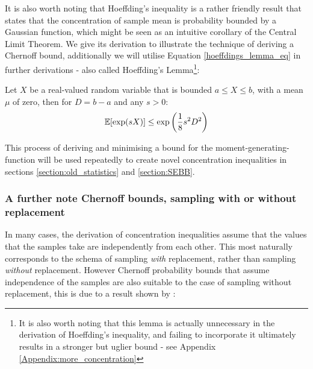 
It is also worth noting that Hoeffding's inequality is a rather friendly result that states that the concentration of sample mean is probability bounded by a Gaussian function, which might be seen as an intuitive corollary of the Central Limit Theorem. 
We give its derivation to illustrate the technique of deriving a Chernoff bound, additionally we will utilise Equation \ref{hoeffdings_lemma_eq} in further derivations - also called Hoeffding's Lemma\footnote{It is also worth noting that this lemma is actually unnecessary in the derivation of Hoeffding's inequality, and failing to incorporate it ultimately results in a stronger but uglier bound - see Appendix \ref{Appendix:more_concentration}}:

\begin{lemma}\label{Hoeffdings_lemma_lemma}
Let $X$ be a real-valued random variable that is bounded $a\le X\le b$, with a mean $\mu$ of zero, then for $D=b-a$ and any $s>0$:
$$\operatorname{\mathbb{E}}[\exp(sX)] \le \exp\left(\frac{1}{8}s^2D^2 \right)$$
\end{lemma}

This process of deriving and minimising a bound for the moment-generating-function will be used repeatedly to create novel concentration inequalities in sections \ref{section:old_statistics} and \ref{section:SEBB}.



\subsubsection{A further note Chernoff bounds, sampling with or without replacement}

In many cases, the derivation of concentration inequalities assume that the values that the samples take are independently from each other. 
This most naturally corresponds to the schema of sampling \textit{with} replacement, rather than sampling \textit{without} replacement.
However Chernoff probability bounds that assume independence of the samples are also suitable to the case of sampling without replacement, this is due to a result shown by \cite{hoeffding1}:

